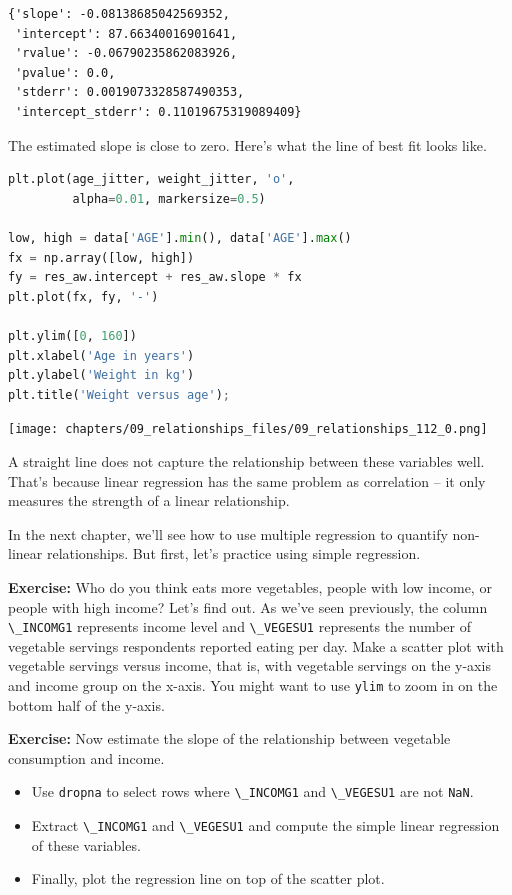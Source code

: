 \begin{lstlisting}[style=output]
{'slope': -0.08138685042569352,
 'intercept': 87.66340016901641,
 'rvalue': -0.06790235862083926,
 'pvalue': 0.0,
 'stderr': 0.0019073328587490353,
 'intercept_stderr': 0.11019675319089409}
\end{lstlisting}

The estimated slope is close to zero. Here's what the line of best fit
looks like.

\begin{lstlisting}[language=Python,style=source]
plt.plot(age_jitter, weight_jitter, 'o', 
         alpha=0.01, markersize=0.5)

low, high = data['AGE'].min(), data['AGE'].max()
fx = np.array([low, high])
fy = res_aw.intercept + res_aw.slope * fx
plt.plot(fx, fy, '-')

plt.ylim([0, 160])
plt.xlabel('Age in years')
plt.ylabel('Weight in kg')
plt.title('Weight versus age');
\end{lstlisting}

\begin{center}
\texttt{[image: chapters/09\_relationships\_files/09\_relationships\_112\_0.png]}
\end{center}

A straight line does not capture the relationship between these
variables well. That's because linear regression has the same problem as
correlation -- it only measures the strength of a linear relationship.

In the next chapter, we'll see how to use multiple regression to
quantify non-linear relationships. But first, let's practice using
simple regression.

\textbf{Exercise:} Who do you think eats more vegetables, people with
low income, or people with high income? Let's find out. As we've seen
previously, the column \passthrough{\lstinline!\_INCOMG1!} represents
income level and \passthrough{\lstinline!\_VEGESU1!} represents the
number of vegetable servings respondents reported eating per day. Make a
scatter plot with vegetable servings versus income, that is, with
vegetable servings on the y-axis and income group on the x-axis. You
might want to use \passthrough{\lstinline!ylim!} to zoom in on the
bottom half of the y-axis.

\textbf{Exercise:} Now estimate the slope of the relationship between
vegetable consumption and income.

\begin{itemize}
\item
  Use \passthrough{\lstinline!dropna!} to select rows where
  \passthrough{\lstinline!\_INCOMG1!} and
  \passthrough{\lstinline!\_VEGESU1!} are not
  \passthrough{\lstinline!NaN!}.
\item
  Extract \passthrough{\lstinline!\_INCOMG1!} and
  \passthrough{\lstinline!\_VEGESU1!} and compute the simple linear
  regression of these variables.
\item
  Finally, plot the regression line on top of the scatter plot.
\end{itemize}

